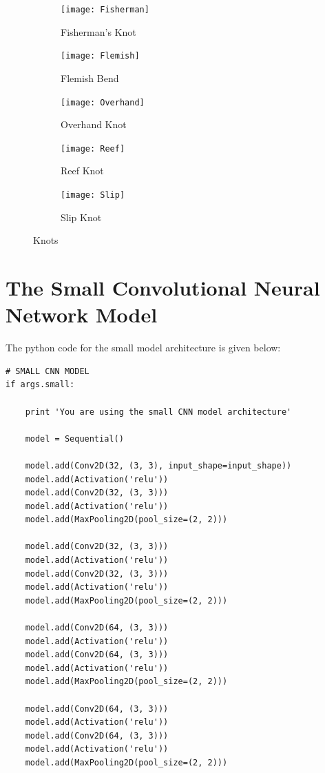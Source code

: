 \documentclass{l4proj}
\begin{document}
\begin{appendices}
\begin{figure}[h!]
\begin{subfigure}{.5\textwidth}
  \centering
  \texttt{[image: Fisherman]}
  \caption{Fisherman's Knot}
  \label{fig:Fisherman}
\end{subfigure}
\begin{subfigure}{.5\textwidth}
  \centering
  \texttt{[image: Flemish]}
  \caption{Flemish Bend}
  \label{fig:Flemish}
\end{subfigure}
\begin{subfigure}{.5\textwidth}
  \centering
  \texttt{[image: Overhand]}
  \caption{Overhand Knot}
  \label{fig:Overhand}
\end{subfigure}
\begin{subfigure}{.5\textwidth}
  \centering
  \texttt{[image: Reef]}
  \caption{Reef Knot}
  \label{fig:Reef}
\end{subfigure}
\begin{subfigure}{.5\textwidth}
  \centering
  \texttt{[image: Slip]}
  \caption{Slip Knot}
  \label{fig:Slip}
\end{subfigure}
\caption{Knots}
\label{fig:knots}
\end{figure}

\chapter{The Small Convolutional Neural Network Model}
\label{appendix:SmallModel}
The python code for the small model architecture is given below:
\begin{lstlisting}
# SMALL CNN MODEL
if args.small:
    
    print 'You are using the small CNN model architecture'
    
    model = Sequential()
    
    model.add(Conv2D(32, (3, 3), input_shape=input_shape))
    model.add(Activation('relu'))
    model.add(Conv2D(32, (3, 3)))
    model.add(Activation('relu'))
    model.add(MaxPooling2D(pool_size=(2, 2)))
    
    model.add(Conv2D(32, (3, 3)))
    model.add(Activation('relu'))
    model.add(Conv2D(32, (3, 3)))
    model.add(Activation('relu'))
    model.add(MaxPooling2D(pool_size=(2, 2)))
    
    model.add(Conv2D(64, (3, 3)))
    model.add(Activation('relu'))
    model.add(Conv2D(64, (3, 3)))
    model.add(Activation('relu'))
    model.add(MaxPooling2D(pool_size=(2, 2)))
    
    model.add(Conv2D(64, (3, 3)))
    model.add(Activation('relu'))
    model.add(Conv2D(64, (3, 3)))
    model.add(Activation('relu'))
    model.add(MaxPooling2D(pool_size=(2, 2)))
    

\end{lstlisting}
\end{appendices}
\end{document}
